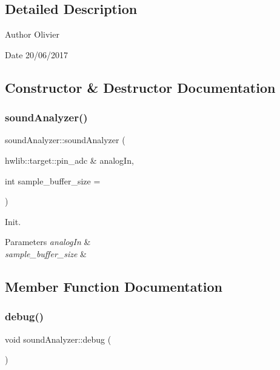 \subsection{Detailed Description}
\begin{DoxyAuthor}{Author}
Olivier 
\end{DoxyAuthor}
\begin{DoxyDate}{Date}
20/06/2017 
\end{DoxyDate}


\subsection{Constructor \& Destructor Documentation}
\mbox{\label{classsound_analyzer_a6d78c426f393464095811648e6a1a923}} 
\subsubsection{\texorpdfstring{sound\+Analyzer()}{soundAnalyzer()}}
{\footnotesize\ttfamily sound\+Analyzer\+::sound\+Analyzer (\begin{DoxyParamCaption}\item[{hwlib\+::target\+::pin\+\_\+adc \&}]{analog\+In,  }\item[{int}]{sample\+\_\+buffer\+\_\+size = {} }\end{DoxyParamCaption})}



Init. 


\begin{DoxyParams}{Parameters}
{\em analog\+In} & \\
\hline
{\em sample\+\_\+buffer\+\_\+size} & \\
\hline
\end{DoxyParams}


\subsection{Member Function Documentation}
\mbox{\label{classsound_analyzer_aaedabb7cf70ed32356f04baae1c9e765}} 
\subsubsection{\texorpdfstring{debug()}{debug()}}
{\footnotesize\ttfamily void sound\+Analyzer\+::debug (\begin{DoxyParamCaption}{ }\end{DoxyParamCaption})}



